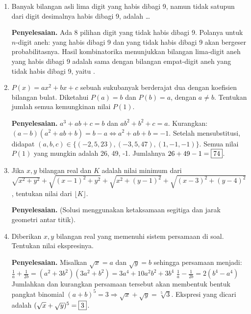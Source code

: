 \documentclass[12pt]{scrartcl}
\begin{document}
\begin{enumerate}
    \textbf{Penyelesaian.} Pisahkan menjadi 1009 subhimpunan $\{n, 2019-n\}$. Maksimum mengambil satu elemen, maka $W=3^{1009}-1$.
    Cari sisa pembagian dengan 1000. $Z \equiv 3^{1009}-1 \pmod{1000}$.
    $Z \equiv 2 \pmod{8}$ dan $Z \equiv 57 \pmod{125}$.
    Menyelesaikan sistem ini didapat $Z \equiv 682 \pmod{1000}$. Tiga digit terakhir adalah .
    
    \item Banyak bilangan asli lima digit yang habis dibagi 9, namun tidak satupun dari digit desimalnya habis dibagi 9, adalah \dots
    
    \textbf{Penyelesaian.} Ada 8 pilihan digit yang tidak habis dibagi 9. Polanya untuk $n$-digit aneh: yang habis dibagi 9 dan yang tidak habis dibagi 9 akan bergeser probabilitasnya. Hasil kombinatorika menunjukkan bilangan lima-digit aneh yang habis dibagi 9 adalah sama dengan bilangan empat-digit aneh yang tidak habis dibagi 9, yaitu .
    
    \item $P(x)=ax^2+bx+c$ sebuah sukubanyak berderajat dua dengan koefisien bilangan bulat. Diketahui $P(a)=b$ dan $P(b)=a$, dengan $a \ne b$. Tentukan jumlah semua kemungkinan nilai $P(1)$.
    
    \textbf{Penyelesaian.} $a^3+ab+c=b$ dan $ab^2+b^2+c=a$. Kurangkan: $(a-b)(a^2+ab+b) = b-a \iff a^2+ab+b=-1$.
    Setelah mensubstitusi, didapat $(a,b,c) \in \{(-2, 5, 23), (-3, 5, 47), (1, -1, -1)\}$. Semua nilai $P(1)$ yang mungkin adalah 26, 49, -1. Jumlahnya $26+49-1 = \fbox{74}$.
    
    \item Jika $x, y$ bilangan real dan $K$ adalah nilai minimum dari $\sqrt{x^2+y^2}+\sqrt{(x-1)^2+y^2}+\sqrt{x^2+(y-1)^2}+\sqrt{(x-3)^2+(y-4)^2}$, tentukan nilai dari $\lfloor K \rfloor$.
    
    \textbf{Penyelesaian.} (Solusi menggunakan ketaksamaan segitiga dan jarak geometri antar titik). 
    
    \item Diberikan $x, y$ bilangan real yang memenuhi sistem persamaan di soal. Tentukan nilai ekspresinya.
    
    \textbf{Penyelesaian.} Misalkan $\sqrt{x}=a$ dan $\sqrt{y}=b$ sehingga persamaan menjadi:
    $\frac{1}{a}+\frac{1}{2b} = (a^2+3b^2)(3a^2+b^2) = 3a^4+10a^2b^2+3b^4$
    $\frac{1}{a}-\frac{1}{2b} = 2(b^4-a^4)$
    Jumlahkan dan kurangkan persamaan tersebut akan membentuk bentuk pangkat binomial $(a+b)^5 = 3 \Rightarrow \sqrt{x}+\sqrt{y} = \sqrt[5]{3}$.
    Ekspresi yang dicari adalah $(\sqrt{x}+\sqrt{y})^5 = \fbox{3}$.
\end{enumerate}
\end{document}
